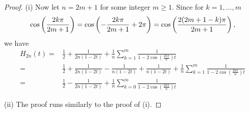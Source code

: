 \documentclass[10pt,a4paper]{amsart}
\begin{document}
\begin{proof}
	(i) Now let $n=2m+1$ for some integer $m\geq1$. Since for $k=1,\ldots,m$
	\[
	\text{\rm cos}\left(\frac{2k\pi}{2m+1}\right)=\text{\rm cos}\left(-\frac{2k\pi}{2m+1}+2\pi\right)=\text{\rm cos}\left(\frac{2(2m+1-k)\pi}{2m+1}\right),
	\]
	we have
\begin{align*}
	H_{2n}(t)=& \frac{1}{2} + \frac{1}{2n(1-2t)}  +\frac{1}{n}\sum_{k=1}^{m}\frac{1}{1-2\cos(\frac{2k\pi}{n})t}	\\
	= & \frac{1}{2} + \frac{1}{2n(1-2t)} -  \frac{1}{n(1-2t)} +  \frac{1}{n(1-2t)} + \frac{1}{n}\sum_{k=1}^{m}\frac{1}{1-2\cos(\frac{2k\pi}{n})t}\\
	= &  \frac{1}{2} - \frac{1}{2n(1-2t)}  + \frac{1}{n}\sum_{k=0}^{m}\frac{1}{1-2\cos(\frac{2k\pi}{n})t}
\end{align*}	
			
	(ii) The proof runs similarly to the proof of (i).
\end{proof}
\end{document}
